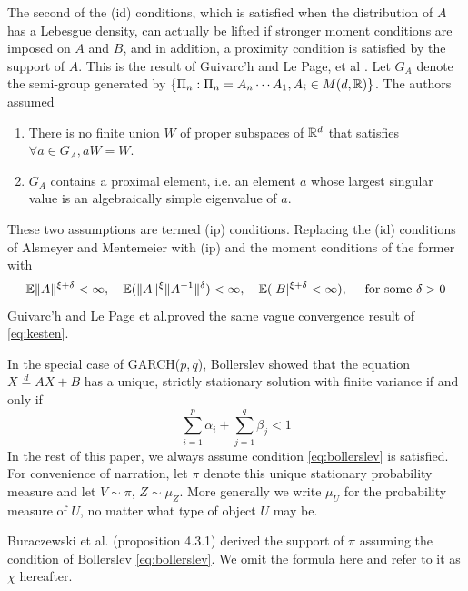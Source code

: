 The second of the (id) conditions, which is satisfied when the
distribution of $A$ has a Lebesgue density, can actually be lifted if
stronger moment conditions are imposed on $A$ and $B$, and in
addition, a proximity condition is satisfied by the support of
$A$. This is the result of Guivarc'h and Le Page, et al
\cite{guivarc:page:2016}. Let $G_A$ denote the semi-group generated
by $\{\Pi_n: \Pi_n = A_n \cdots A_1, A_i \in M(d, \mathbb R)\}$. The
authors assumed
\begin{enumerate}
  \item There is no finite union $W$ of proper subspaces of $\mathbb R^d$
    that satisfies $\forall a \in G_A, a W = W$.
  \item $G_A$ contains a proximal element, i.e. an element $a$ whose
    largest singular value is an algebraically simple eigenvalue of $a$.
\end{enumerate}
These two assumptions are termed (ip) conditions. Replacing the (id)
conditions of Alsmeyer and Mentemeier with (ip) and the moment
conditions of the former with
\[
\mathbb{E} \|A\|^{\xi + \delta} < \infty, \quad
\mathbb{E} (\|A\|^{\xi} \|A^{-1}\|^{\delta}) < \infty, \quad
\mathbb{E} (|B|^{\xi + \delta} < \infty),\quad
\text{ for some }\delta > 0
\]
Guivarc'h and Le Page et al.proved the same vague convergence result
of \eqref{eq:kesten}.

In the special case of GARCH($p, q$),
Bollerslev \cite{bollerslev:1986} showed that the 
equation $X \overset{d}{=} A X + B$ has a unique, strictly
stationary solution with finite variance if and only if
\begin{equation}
  \sum_{i=1}^p \alpha_i + \sum_{j=1}^q \beta_j < 1
  \label{eq:bollerslev}
\end{equation}
In the rest of this paper, we always assume condition
\eqref{eq:bollerslev} is satisfied. For convenience of narration, let
$\pi$ denote this unique stationary probability measure and let
$V \sim \pi$, $Z \sim \mu_Z$. More generally we write $\mu_U$ for the
probability measure of $U$, no matter what type of object $U$ may be.

Buraczewski et al.\cite{buraczewski:damek:mikosch:2016} (proposition
4.3.1) derived the support of $\pi$ assuming the condition of
Bollerslev \ref{eq:bollerslev}. We omit the formula here and refer to it as
$\chi$ hereafter.


